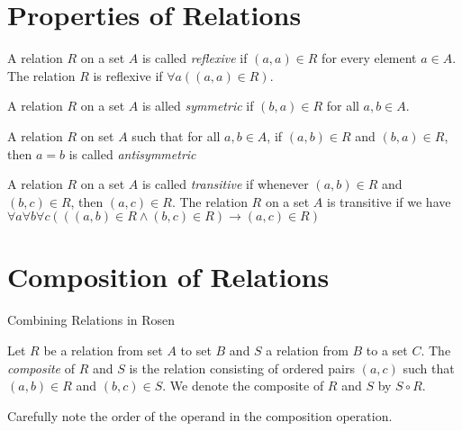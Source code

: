\section {Properties of Relations}
    \begin {definition}
    A relation $R$ on a set $A$ is called \textit{reflexive} if $(a,a) \in R$ for every element $a \in A$. The relation $R$ is reflexive if $\forall a((a,a) \in R)$.
    \end {definition}
    
    \begin {definition}
    A relation $R$ on a set $A$ is alled \textit{symmetric} if $(b,a) \in R$ for all $a,b \in A$.
    \end {definition} 
    
    \begin {definition}[Antisymmetric]
    A relation $R$ on set $A$ such that for all $a,b \in A$, if $(a,b) \in R$ and $(b,a) \in R$, then $a=b$ is called \textit{antisymmetric}
    \end {definition}
    
    \begin {definition}
    A relation $R$ on a set $A$ is called \textit{transitive} if whenever $(a,b)\in R$ and $(b,c) \in R$, then $(a,c) \in R$. The relation $R$ on a set $A$ is transitive if we have $\forall a \forall b \forall c (((a,b) \in R \land (b,c) \in R) \rightarrow (a,c) \in R)$
    \end {definition}
    
    \begin{definition}
    \end{definition}


\section {Composition of Relations}
Combining Relations in Rosen

\begin{definition}
Let $R$ be a relation from set $A$ to set $B$ and $S$ a relation from $B$ to a set $C$. The \textit{composite} of $R$ and $S$ is the relation consisting of ordered pairs $(a,c)$ such that $(a,b) \in R$ and $(b,c) \in S$. We denote the composite of $R$ and $S$ by $S \circ R$.
\begin{notes}
Carefully note the order of the operand in the composition operation.
\end{notes}
\end{definition}


